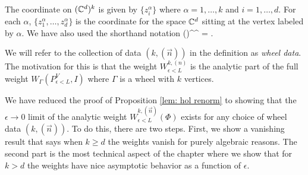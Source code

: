 \documentclass[10pt]{article}
\begin{document}
The coordinate on $(\mathbb C^{d})^k$ is given by $\{z_i^\alpha\}$ where $\alpha = 1,\ldots,k$ and $i = 1, \ldots, d$. 
For each $\alpha$, $\{z_1^\alpha, \ldots, z_d^\alpha\}$ is the coordinate for the space $\mathbb C^d$ sitting at the vertex labeled by $\alpha$. 
We have also used the shorthand notation
\ben
\left(\right)^{^\alpha} =  \cdots  {}.
\een

We will refer to the collection of data $(k, (\vec{n}))$ in the definition as {\em wheel data}.
The motivation for this is that the weight $W_{\epsilon < L}^{k, (n)}$ is the analytic part of the full weight $W_{\Gamma}(P^V_{\epsilon<L}, I)$ where $\Gamma$ is a wheel with $k$ vertices. 

We have reduced the proof of Proposition \ref{lem: hol renorm} to showing that the $\epsilon \to 0$ limit of the analytic weight $W_{\epsilon < L}^{k, (\vec{n})}(\Phi)$ exists for any choice of wheel data $(k, (\vec{n}))$.
To do this, there are two steps. 
First, we show a vanishing result that says when $k \geq d$ the  weights vanish for purely algebraic reasons. 
The second part is the most technical aspect of the chapter where we show that for $k > d$ the weights have nice asymptotic behavior as a function of $\epsilon$.
\end{document}
